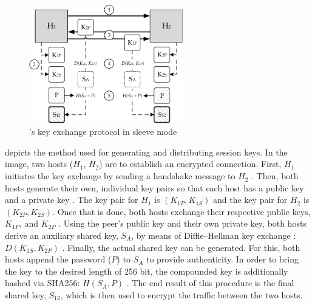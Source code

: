 \begin{figure}[htpb]
  \centering
  \includegraphics[width=0.6\textwidth]{figures/weave-encryption.pdf}
  \caption[\weave 's key exchange protocol]{\wnet 's key exchange protocol in sleeve mode}\label{fig:weaveencryption}
\end{figure}
 depicts the method used for generating and distributing session keys. In the image, two hosts ($H_1$, $H_2$) are to establish an encrypted connection. First, $H_1$ initiates the key exchange by sending a handshake message to $H_2$ . Then, both hosts generate their own, individual key pairs so that each host has a public key and a private key . The key pair for $H_1$ is $(K_{1P}, K_{1S})$ and the key pair for $H_2$ is $(K_{2P}, K_{2S})$. Once that is done, both hosts exchange their respective public keys, $K_{1P}$, and $K_{2P}$ . Using the peer's public key and their own private key, both hosts derive an auxiliary shared key, $S_A$, by means of Diffie--Hellman key exchange \cite{bresson2001provably}: $D(K_{1S},K_{2P})$ . Finally, the actual shared key can be generated. For this, both hosts append the password ($P$) to $S_A$ to provide authenticity. In order to bring the key to the desired length of 256 bit, the compounded key is additionally hashed via SHA256: $H(S_A, P)$ . The end result of this procedure is the final shared key, $S_{12}$, which is then used to encrypt the traffic between the two hosts.
%
%
%
%
%
%
%
%
%
%
%
%
%
%
%
%
%
%
%
%
